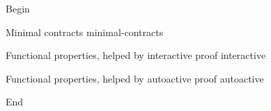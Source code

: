 Begin

\begin{levelTwo}
  {Minimal contracts}
  {minimal-contracts}
\end{levelTwo}

\begin{levelTwo}
  {Functional properties, helped by interactive proof}
  {interactive}
\end{levelTwo}

\begin{levelTwo}
  {Functional properties, helped by autoactive proof}
  {autoactive}
\end{levelTwo}


\horizontalLine
\newpage

End
